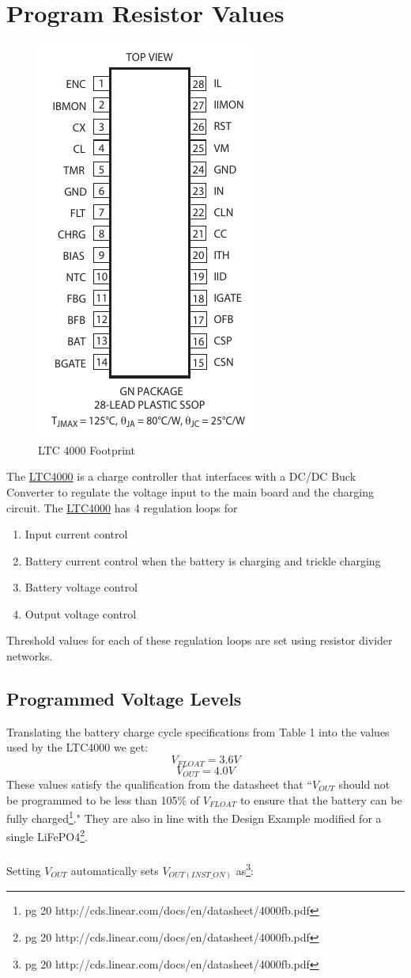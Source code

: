 \documentclass{article}
\begin{document}
\section{Program Resistor Values}
\begin{figure}[h]
\centering
\caption{LTC 4000 Footprint}
\includegraphics[width=.25\textwidth]{footprint}
\end{figure}
The \href{http://cds.linear.com/docs/en/datasheet/4000fa.pdf}{LTC4000} is a charge controller that interfaces with a DC/DC Buck Converter to regulate the voltage input to the main board  and the charging circuit. The \href{http://cds.linear.com/docs/en/datasheet/4000fa.pdf}{LTC4000} has 4 regulation loops for
\begin{enumerate}
\item Input current control
\item Battery current control when the battery is charging and trickle charging
\item Battery voltage control
\item Output voltage control
\end{enumerate}
Threshold values for each of these regulation loops are set using resistor divider networks. 

\subsection{Programmed Voltage Levels}
Translating the battery charge cycle specifications from Table 1 into the values used by the LTC4000 we get:
\[V_{FLOAT} = 3.6V\]
\[V_{OUT} = 4.0V\]
These values satisfy the qualification from the datasheet that ``$V_{OUT}$ should not be programmed to be less than 105\% of $V_{FLOAT}$ to ensure that the battery can be fully charged\footnote{pg 20 http://cds.linear.com/docs/en/datasheet/4000fb.pdf}." They are also in line with the Design Example modified for a single LiFePO4\footnote{pg 20 http://cds.linear.com/docs/en/datasheet/4000fb.pdf}.\\ \\
Setting $V_{OUT}$ automatically sets $V_{OUT(INST\_ON)}$ as\footnote{pg 20 http://cds.linear.com/docs/en/datasheet/4000fb.pdf}:
 
\end{document}
